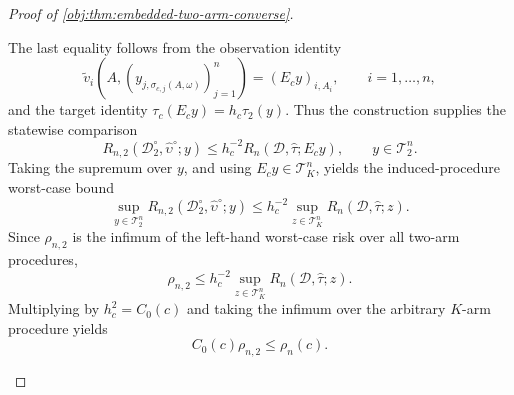 \begin{proof}[Proof of \cref{obj:thm:embedded-two-arm-converse}]
\begin{enumerate}
\[\]
The last equality follows from the observation identity
\[
\widetilde v_i(A,(y_{j,\sigma_{c,j}(A,\omega)})_{j=1}^n)=(E_cy)_{i,A_i},
\qquad i=1,\ldots,n,
\]
and the target identity \(\tau_c(E_cy)=h_c\tau_2(y)\). Thus the construction supplies the statewise comparison
\[
R_{n,2}(\mathcal D_2^\circ,\widehat\upsilon^\circ;y)
\le
h_c^{-2}R_n(\mathcal D,\widehat\tau;E_cy),
\qquad y\in\mathcal T_2^n.
\]
Taking the supremum over \(y\), and using \(E_cy\in\mathcal T_K^n\), yields the induced-procedure worst-case bound
\[
\sup_{y\in\mathcal T_2^n}R_{n,2}(\mathcal D_2^\circ,\widehat\upsilon^\circ;y)
\le
h_c^{-2}\sup_{z\in\mathcal T_K^n}R_n(\mathcal D,\widehat\tau;z).
\]
Since \(\rho_{n,2}\) is the infimum of the left-hand worst-case risk over all two-arm procedures,
\[
\rho_{n,2}
\le
h_c^{-2}\sup_{z\in\mathcal T_K^n}R_n(\mathcal D,\widehat\tau;z).
\]
Multiplying by \(h_c^2=C_0(c)\) and taking the infimum over the arbitrary \(K\)-arm procedure yields
\[
C_0(c)\rho_{n,2}\le \rho_n(c).
\]


\end{enumerate}
\end{proof}
